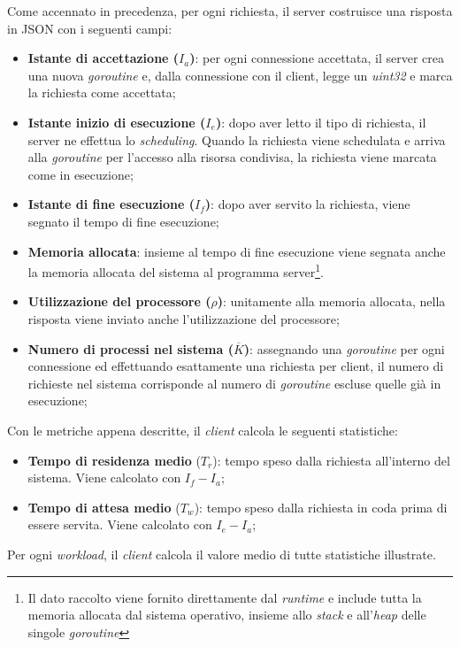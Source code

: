 Come accennato in precedenza, per ogni richiesta, il server costruisce una risposta in JSON con i seguenti campi:
\begin{itemize}
    \item \textbf{Istante di accettazione ($I_a$)}: per ogni connessione accettata, il server crea una nuova \textit{goroutine} e, dalla connessione con il client, legge un \textit{uint32} e marca la richiesta come accettata;
    \item \textbf{Istante inizio di esecuzione ($I_e$)}: dopo aver letto il tipo di richiesta, il server ne effettua lo \textit{scheduling}. Quando la richiesta viene schedulata e arriva alla \textit{goroutine} per l'accesso alla risorsa condivisa, la richiesta viene marcata come in esecuzione;
    \item \textbf{Istante di fine esecuzione ($I_f$)}: dopo aver servito la richiesta, viene segnato il tempo di fine esecuzione;
    \item \textbf{Memoria allocata}: insieme al tempo di fine esecuzione viene segnata anche la memoria allocata del sistema al programma server\footnote{Il dato raccolto viene fornito direttamente dal \textit{runtime} e include tutta la memoria allocata dal sistema operativo, insieme allo \textit{stack} e all'\textit{heap} delle singole \textit{goroutine}}.
    \item \textbf{Utilizzazione del processore ($\rho$)}: unitamente alla memoria allocata, nella risposta viene inviato anche l'utilizzazione del processore; 
    \item \textbf{Numero di processi nel sistema ($\overline{K}$)}: assegnando una \textit{goroutine} per ogni connessione ed effettuando esattamente una richiesta per client, il numero di richieste nel sistema corrisponde al numero di \textit{goroutine} escluse quelle già in esecuzione;
\end{itemize}

Con le metriche appena descritte, il \textit{client} calcola le seguenti statistiche:
\begin{itemize}
    \item \textbf{Tempo di residenza medio} ($T_r$): tempo speso dalla richiesta all'interno del sistema. Viene calcolato con $I_f-I_a$;
    \item \textbf{Tempo di attesa medio} ($T_w$): tempo speso dalla richiesta in coda prima di essere servita. Viene calcolato con $I_e - I_a$;
\end{itemize}

Per ogni \textit{workload}, il \textit{client} calcola il valore medio di tutte statistiche illustrate.

